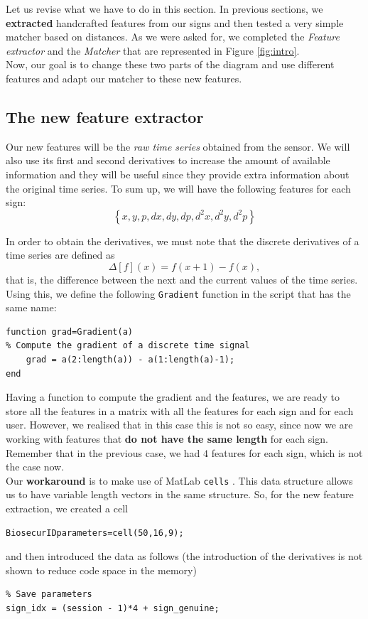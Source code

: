 \documentclass[a4paper]{article}
\def\inline{\lstinline[basicstyle=\ttfamily,keywordstyle={}]}
\begin{document}
{Let us revise what we have to do in this section. In previous sections, we \textbf{extracted} handcrafted features from our signs and then tested a very simple matcher based on distances. As we were asked for, we completed the \emph{Feature extractor} and the \emph{Matcher} that are represented in Figure \ref{fig:intro}.\\

Now, our goal is to change these two parts of the diagram and use different features and adapt our matcher to these new features.

\subsection{The new feature extractor}

Our new features will be the \emph{raw time series} obtained from the sensor. We will also use its first and second derivatives to increase the amount of available information and they will be useful since they provide extra information about the original time series. To sum up, we will have the following features for each sign:
\[
\left\{x, y, p, dx, dy, dp, d^2x, d^2y, d^2p\right\}  
\]

In order to obtain the derivatives, we must note that the discrete derivatives of a time series are defined as
\[
 \Delta [f](x)=f(x+1)-f(x),
\]
that is, the difference between the next and the current values of the time series. Using this, we define the following \inline{Gradient} function in the script that has the same name:
\begin{verbatim}
function grad=Gradient(a)
% Compute the gradient of a discrete time signal
    grad = a(2:length(a)) - a(1:length(a)-1);
end
\end{verbatim}

Having a function to compute the gradient and the features, we are ready to store all the features in a matrix with all the features for each sign and for each user. However, we realised that in this case this is not so easy, since now we are working with features that \textbf{do not have the same length} for each sign. Remember that in the previous case, we had \(4\) features for each sign, which is not the case now.\\

Our \textbf{workaround} is to make use of MatLab \inline{cells} \footnotemark. This data structure allows us to have variable length vectors in the same structure. So, for the new feature extraction, we created a cell
\begin{verbatim}
BiosecurIDparameters=cell(50,16,9);
\end{verbatim}
  and then introduced the data as follows (the introduction of the derivatives is not shown to reduce code space in the memory)
\begin{verbatim}
% Save parameters
sign_idx = (session - 1)*4 + sign_genuine;


\end{verbatim}}
\end{document}
